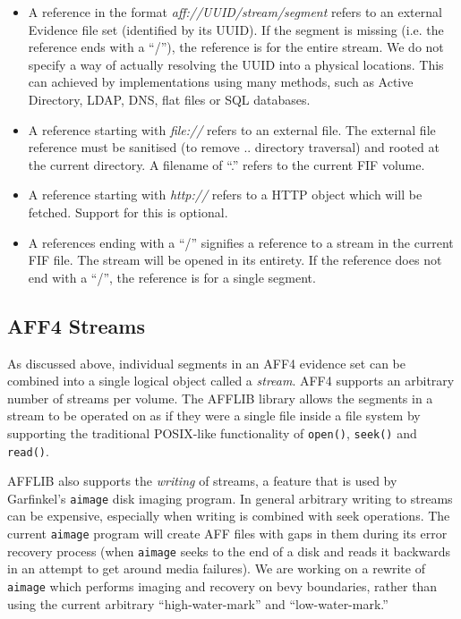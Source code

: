 \documentclass[10pt, conference]{IEEEtran}
\begin{document}
\begin{itemize}
\item A reference in the format {\em aff://UUID/stream/segment} refers
to an external Evidence file set (identified by its UUID). If the segment
is missing (i.e. the reference ends with a ``/''), the reference is
for the entire stream. We do not specify a way of actually resolving
the UUID into a physical locations. This can achieved by
implementations using many methods, such as Active Directory, LDAP,
DNS, flat files or SQL databases.

\item A reference starting with {\em file://} refers to an external
file. The external file reference must be sanitised (to remove
.. directory traversal) and rooted at the current directory. A
filename of ``.'' refers to the current FIF volume.

\item A reference starting with {\em http://} refers to a HTTP
object which will be fetched. Support for this is optional.

\item A references ending with a ``/'' signifies a reference to a
stream in the current FIF file. The stream will be opened in its
entirety. If the reference does not end with a ``/'', the reference is
for a single segment.
\end{itemize}

\subsection{AFF4 Streams}
As discussed above, individual segments in an AFF4 evidence set can be
combined into a single logical object called a \emph{stream}. AFF4
supports an arbitrary number of streams per volume. The AFFLIB library
allows the segments in a stream to be operated on as if they were a
single file inside a file system by supporting the traditional
POSIX-like functionality of \texttt{open()}, \texttt{seek()} and
\texttt{read()}.

AFFLIB also supports the \emph{writing} of streams, a feature that is
used by Garfinkel's \texttt{aimage} disk imaging program. In general
arbitrary writing to streams can be expensive, especially when writing
is combined with seek operations. The current \texttt{aimage} program
will create AFF files with gaps in them during its error recovery
process (when \texttt{aimage} seeks to the end of a disk and reads it
backwards in an attempt to get around media failures). We are working
on a rewrite of \texttt{aimage} which performs imaging and recovery
on bevy boundaries, rather than using the current arbitrary
``high-water-mark'' and ``low-water-mark.''
\end{document}
